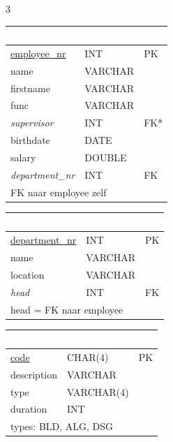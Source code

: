 \documentclass[10pt,a4paper]{article}
\newcommand{\TBLH}[1]{\textbf{\textcolor{white}{#1}}}
\begin{document}
\begin{multicols}{3}
{\scriptsize
\begin{tabular}{|l|l|l|}
\hline
\rowcolor{tblhead}\TBLH{employee} & \TBLH{type} & \TBLH{} \\ \hline
\underline{employee\_nr} & INT & PK \\ \hline
name & VARCHAR & \\ \hline
firstname & VARCHAR & \\ \hline
func & VARCHAR & \\ \hline
\textit{supervisor} & INT & FK* \\ \hline
birthdate & DATE & \\ \hline
salary & DOUBLE & \\ \hline
\textit{department\_nr} & INT & FK \\ \hline
\multicolumn{3}{|l|}{\tiny *FK naar employee zelf} \\ \hline
\end{tabular}}

\vspace{3pt}

{\scriptsize
\begin{tabular}{|l|l|l|}
\hline
\rowcolor{tblhead}\TBLH{department} & \TBLH{type} & \TBLH{} \\ \hline
\underline{department\_nr} & INT & PK \\ \hline
name & VARCHAR & \\ \hline
location & VARCHAR & \\ \hline
\textit{head} & INT & FK \\ \hline
\multicolumn{3}{|l|}{\tiny head = FK naar employee} \\ \hline
\end{tabular}}

\columnbreak

{\scriptsize
\begin{tabular}{|l|l|l|}
\hline
\rowcolor{tblhead}\TBLH{course} & \TBLH{type} & \TBLH{} \\ \hline
\underline{code} & CHAR(4) & PK \\ \hline
description & VARCHAR & \\ \hline
type & VARCHAR(4) & \\ \hline
duration & INT & \\ \hline
\multicolumn{3}{|l|}{\tiny types: BLD, ALG, DSG} \\ \hline
\end{tabular}}

\vspace{3pt}


\end{multicols}
\end{document}
